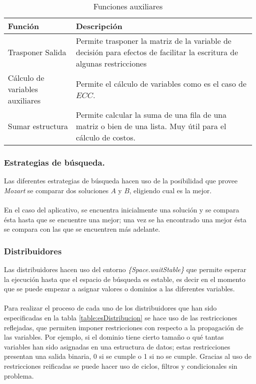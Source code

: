 \begin{center}
\begin{longtable}{|p{5cm}|p{11.5cm}|}
	\caption{Funciones auxiliares} \label{table:funauxiliar}\\
	\hline
	\cellcolor[gray]{0.9} \textbf{Función} & \cellcolor[gray]{0.9}\textbf{Descripción} \\
	\hline
	Trasponer Salida & Permite trasponer la matriz de la variable de decisión para efectos de facilitar la escritura de algunas restricciones\\
	\hline
	Cálculo de variables auxiliares &  Permite el cálculo de variables como es el caso de $ECC$.\\
	\hline
	Sumar estructura &  Permite calcular la suma de una fila de una matriz o bien de una lista. Muy útil para el cálculo de costos.\\
	\hline
\end{longtable}	
\end{center}

\subsubsection{Estrategias de búsqueda.}

Las diferentes estrategias de búsqueda hacen uso de la posibilidad que provee \textit{Mozart} se comparar dos soluciones $A$ y $B$, eligiendo cual es la mejor.
\\\\
En el caso del aplicativo, se encuentra inicialmente una solución y se compara ésta hasta que se encuentre una mejor; una vez se ha encontrado una mejor ésta se compara con las que se encuentren más adelante.

\subsubsection{Distribuidores}

Las distribuidores hacen uso del entorno \textit{\{Space.waitStable\}} que permite esperar la ejecución hasta que el espacio de búsqueda es estable, es decir en el momento que se puede empezar a asignar valores o dominios a las diferentes variables.
\\\\
Para realizar el proceso de cada uno de los distribuidores que han sido especificadas en la tabla \ref{table:esDistribucion} se hace uso de las restricciones reflejadas, que permiten imponer restricciones con respecto a la propagación de las variables. Por ejemplo, si el dominio tiene cierto tamaño o qué tantas variables han sido asignadas en una estructura de datos; estas restricciones presentan una salida binaria, 0 si se cumple o 1 si no se cumple.
Gracias al uso de restricciones reificadas se puede hacer uso de ciclos, filtros y condicionales sin problema.

